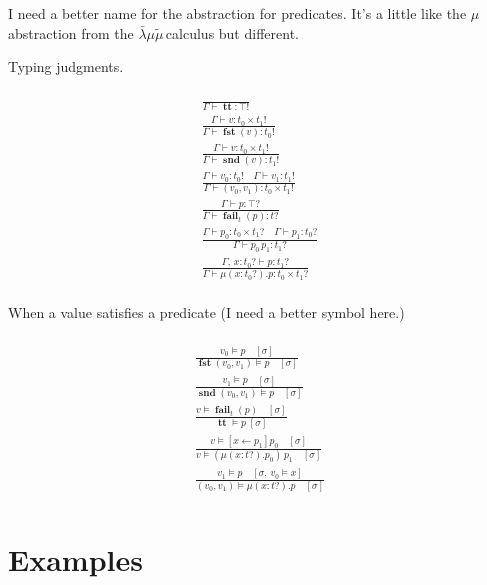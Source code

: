\documentclass[twocolumn]{scrartcl}
\newcommand{\lk}{\(\bar{\lambda}\mu\tilde{\mu}\,\)}
\DeclareMathOperator{\coin}{\textbf{tt}}
\DeclareMathOperator{\fst}{\textbf{fst}}
\DeclareMathOperator{\snd}{\textbf{snd}}
\DeclareMathOperator{\fail}{\textbf{fail}}
\DeclareMathOperator{\update}{\leftarrow}
\begin{document}
I need a better name for the abstraction for predicates. It's a little
like the \(\mu\) abstraction from the \lk calculus but
different.

Typing judgments.

\begin{multline*}
  \\
  \frac{
  }{
    \Gamma \vdash \coin \colon \top !
  }\\
  \frac{
    \Gamma \vdash v \colon t_0 \times t_1 !
  }{
    \Gamma \vdash \fst(v) \colon t_0 !
  }\\
  \frac{
    \Gamma \vdash v \colon t_0 \times t_1 !
  }{
    \Gamma \vdash \snd(v) \colon t_1 !
  }\\
  \frac{
    \Gamma \vdash v_0 \colon t_0 ! \quad
    \Gamma \vdash v_1 \colon t_1 !
  }{
    \Gamma \vdash ( v_0 , v_1 ) \colon t_0 \times t_1 !
  }\\
  \frac{
    \Gamma \vdash p \colon \top ?
  }{
    \Gamma \vdash \fail_t(p) \colon t ?
  }\\
  \frac{
    \Gamma \vdash p_0 \colon t_0 \times t_1 ? \quad
    \Gamma \vdash p_1 \colon t_0 ?
  }{
    \Gamma \vdash p_0 \, p_1 \colon t_1 ?
  }\\
  \frac{
    \Gamma , \, x \colon t_0 ? \vdash p \colon t_1 ?
  }{
    \Gamma \vdash \mu ( x \colon t_0 ? ) . p \colon t_0 \times t_1 ?
  }\\
\end{multline*}

When a value satisfies a predicate (I need a better symbol here.)

\begin{multline*}
  \\
\frac{
  v_0 \models p \quad [\sigma]
}{
  \fst ( v_0 , v_1 ) \models p \quad [\sigma]
}\\
\frac{
  v_1 \models p \quad [\sigma]
}{
  \snd ( v_0 , v_1 ) \models p \quad [\sigma]
}\\
\frac{
  v \models \fail_t(p) \quad [\sigma]
}{
  \coin \models p \; [\sigma]
}\\
\frac{
  v \models [x \update p_1] p_0 \quad [\sigma]
}{
  v \models ( \mu (x \colon t ?). p_0) \, p_1 \quad [\sigma]
}\\
\frac{
  v_1 \models p \quad [ \sigma , \, v_0 \models x]
}{
  ( v_0 , v_1 ) \models \mu (x \colon t ?). p \quad [\sigma]
}\\
\end{multline*}

\section*{Examples}
\end{document}
